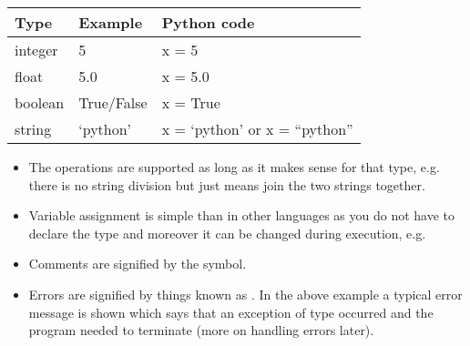 \documentclass[letterpaper,10pt,english,openany]{sphinxmanual}
\begin{document}
\begin{savenotes}\sphinxattablestart
\centering
\begin{tabulary}{\linewidth}[t]{|T|T|T|}
\hline

Type
&
Example
&
Python code
\\
\hline
integer
&
5
&
x = 5
\\
\hline
float
&
5.0
&
x = 5.0
\\
\hline
boolean
&
True/False
&
x = True
\\
\hline
string
&
‘python’
&
x = ‘python’ or x = “python”
\\
\hline
\end{tabulary}
\par
\sphinxattableend\end{savenotes}
\begin{itemize}
\item {} 
The operations are supported as long as it makes sense for that type,
e.g. there is no string division but \sphinxcode{\sphinxupquote{+}} just means join the two
strings together.

\item {} 
Variable assignment is simple than in other languages as you do not
have to declare the type and moreover it can be changed during
execution, e.g.

\end{itemize}

\begin{sphinxVerbatim}[commandchars=\\\{\}]
 
  
  

  
  

\end{sphinxVerbatim}
\begin{itemize}
\item {} 
Comments are signified by the \sphinxcode{\sphinxupquote{\#}} symbol.

\item {} 
Errors are signified by things known as . In the above
example a typical error message is shown which says that an exception
of type  occurred and the program needed to terminate
(more on handling errors later).

\end{itemize}
\end{document}
